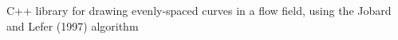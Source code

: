 C++ library for drawing evenly-\/spaced curves in a flow field, using the Jobard and Lefer (1997) algorithm 